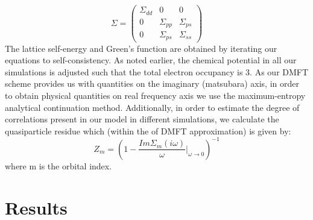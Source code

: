 \documentclass[10pt]{ruthesis}
\begin{document}
{\begin{equation}\label{selfenergy}
\Sigma=
\left(
\begin{array}{ccc}
\Sigma_{dd}&0&0\\
0&\Sigma_{pp}&\Sigma_{ps}\\
0&\Sigma_{ps}&\Sigma_{ss}
\end{array}
\right)
\end{equation}
The lattice self-energy and Green's function are obtained by iterating our equations to self-consistency. As noted earlier, the chemical potential in all our simulations is adjusted such that the total electron occupancy is  $3$. As our DMFT scheme provides us with quantities on the imaginary (matsubara) axis, in order
to obtain physical quantities on real frequency axis we use the maximum-entropy analytical continuation method\cite{PhysicsReports_MEM_1996_M.Jarrell}. Additionally, in order to estimate the degree of correlations present in our model in different simulations, we calculate the quasiparticle residue which (within the of DMFT approximation) is given by:
\begin{equation}\label{QP}
 Z_m=\left(1-\frac{Im\Sigma_m(i\omega)}{\omega}|_{\omega\rightarrow 0}\right)^{-1}
\end{equation} 
where m is the orbital index.



\section{Results}
}
\end{document}
